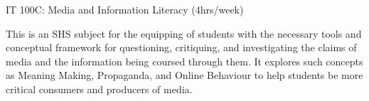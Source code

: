 \begin{subject} IT 100C: Media and Information Literacy
\hfill
(4hrs/week)
\end{subject}
This is an SHS subject for the equipping of students with the necessary tools and conceptual framework for questioning, critiquing, and investigating the claims of media and the information being coursed through them. It explores such concepts as Meaning Making, Propaganda, and Online Behaviour to help students be more critical consumers and producers of media.
